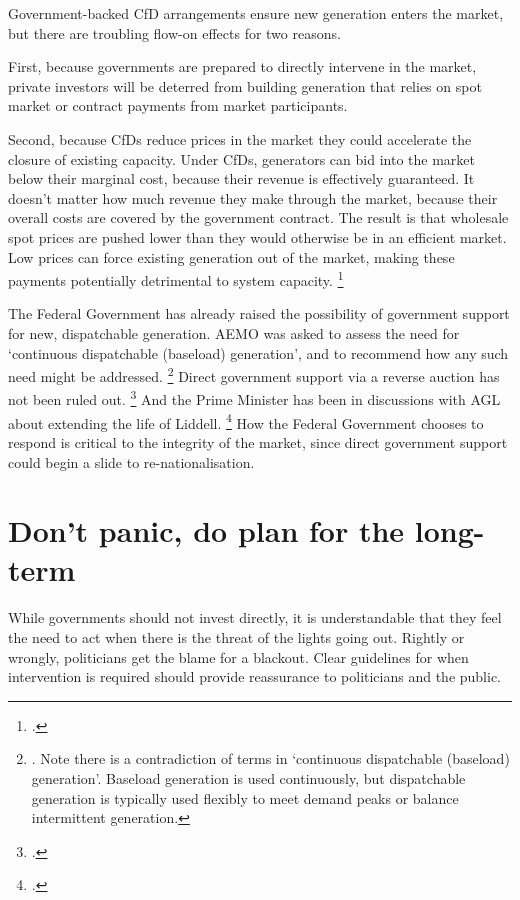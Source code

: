 \documentclass[FrontPage]{grattan}
\begin{document}
Government-backed CfD arrangements ensure new generation enters the market, but there are troubling flow-on effects for two reasons. 

First, because governments are prepared to directly intervene in the market, private investors will be deterred from building generation that relies on spot market or contract payments from market participants. 

Second, because CfDs reduce prices in the market they could accelerate the closure of existing capacity. Under CfDs, generators can bid into the market below their marginal cost, because their revenue is effectively guaranteed. It doesn't matter how much revenue they make through the market, because their overall costs are covered by the government contract. The result is that wholesale spot prices are pushed lower than they would otherwise be in an efficient market. Low prices can force existing generation out of the market, making these payments potentially detrimental to system capacity.%
\footcite{EC2015CapacityMechanisms} 

The Federal Government has already raised the possibility of government support for new, dispatchable generation. AEMO was asked to assess the need for `continuous dispatchable (baseload) generation', and to recommend how any such need might be addressed.%
\footnote{\textcite{Turnbull2017FinkelResponse}. Note there is a contradiction of terms in `continuous dispatchable (baseload) generation'. Baseload generation is used continuously, but dispatchable generation is typically used flexibly to meet demand peaks or balance intermittent generation.}
Direct government support via a reverse auction has not been ruled out.%
\footcites{Turnbull2017FinkelResponse}{Murphy2017TurnbullLeavesCETopen}
And the Prime Minister has been in discussions with AGL about extending the life of Liddell.%
\footcite{Grattan2017AGLrejectsTurnbull}
How the Federal Government chooses to respond is critical to the integrity of the market, since direct government support could begin a slide to re-nationalisation.

\section{Don't panic, do plan for the long-term}\label{sec:NEM-already-has-a-safety-net}
While governments should not invest directly, it is understandable that they feel the need to act when there is the threat of the lights going out. Rightly or wrongly, politicians get the blame for a blackout. Clear guidelines for when intervention is required should provide reassurance to politicians and the public. 
\end{document}
